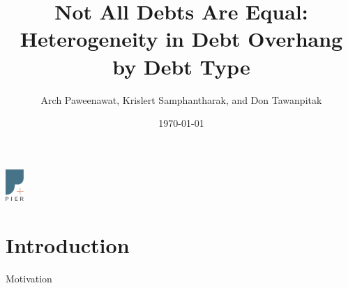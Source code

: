 \documentclass[11pt,aspectratio=169, c]{beamer} %
\title[Debt Overhang]{Not All Debts Are Equal: \\ Heterogeneity in Debt Overhang by Debt Type}
\author[Paweenawat, Samphantharak, Tawanpitak]{Arch Paweenawat, Krislert Samphantharak, and Don Tawanpitak}
\date{\today}
\begin{document}
	\begin{frame}[paper]
		
		\titlepage
		
		\begin{center}
			\includegraphics[height=1.2cm]{resources/pier-logo.pdf}
		\end{center}
		
	\end{frame}
	
	
	
%		
%		
	
	
	\setlength{\parskip}{2em}
	
	
	
	
	
	
	
	
	

	\section{Introduction}

	\begin{frame}{Motivation}
		
		
		
	\end{frame}
\end{document}

